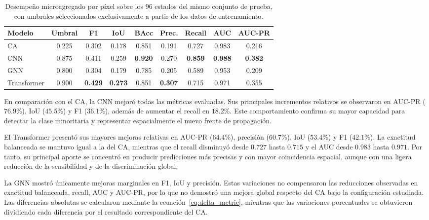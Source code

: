 \documentclass[fleqn,10pt]{wlscirep}
\begin{document}
\begin{table}[H]
\centering
\caption{Desempeño microagregado por píxel sobre los 96 estados del mismo conjunto de prueba, con umbrales seleccionados exclusivamente a partir de los datos de entrenamiento.}
\label{tab:modelos}
\scriptsize
\setlength{\tabcolsep}{3.2pt}
\begin{tabular}{lcccccccc}
\toprule
\textbf{Modelo} & \textbf{Umbral} & \textbf{F1} & \textbf{IoU} &
\textbf{BAcc} & \textbf{Prec.} & \textbf{Recall} &
\textbf{AUC} & \textbf{AUC-PR}\\
\midrule
CA          & 0.225 & 0.302 & 0.178 & 0.851 & 0.191 & 0.727 & 0.983 & 0.216\\
CNN         & 0.875 & 0.411 & 0.259 & \textbf{0.920} & 0.270 & \textbf{0.859} & \textbf{0.988} & \textbf{0.382}\\
GNN         & 0.800 & 0.304 & 0.179 & 0.785 & 0.205 & 0.589 & 0.953 & 0.209\\
Transformer & 0.900 & \textbf{0.429} & \textbf{0.273} & 0.851 & \textbf{0.307} & 0.715 & 0.971 & 0.355\\
\bottomrule
\end{tabular}
\end{table}

En comparación con el CA, la CNN mejoró todas las métricas evaluadas.
Sus principales incrementos relativos se observaron en AUC-PR
($76.9\%$), IoU ($45.5\%$) y F1 ($36.1\%$), además de aumentar el
recall en $18.2\%$. Este comportamiento confirma su mayor capacidad
para detectar la clase minoritaria y representar espacialmente el
nuevo frente de propagación.

El Transformer presentó sus mayores mejoras relativas en AUC-PR
($64.4\%$), precisión ($60.7\%$), IoU ($53.4\%$) y F1 ($42.1\%$).
La exactitud balanceada se mantuvo igual a la del CA, mientras que el
recall disminuyó desde $0.727$ hasta $0.715$ y el AUC desde $0.983$
hasta $0.971$. Por tanto, su principal aporte se concentró en producir
predicciones más precisas y con mayor coincidencia espacial, aunque con
una ligera reducción de la sensibilidad y de la discriminación global.

La GNN mostró únicamente mejoras marginales en F1, IoU y precisión.
Estas variaciones no compensaron las reducciones observadas en exactitud
balanceada, recall, AUC y AUC-PR, por lo que no demostró una mejora
global respecto del CA bajo la configuración estudiada. Las diferencias
absolutas se calcularon mediante la ecuación~\ref{eq:delta_metric},
mientras que las variaciones porcentuales se obtuvieron dividiendo cada
diferencia por el resultado correspondiente del CA.
\end{document}
